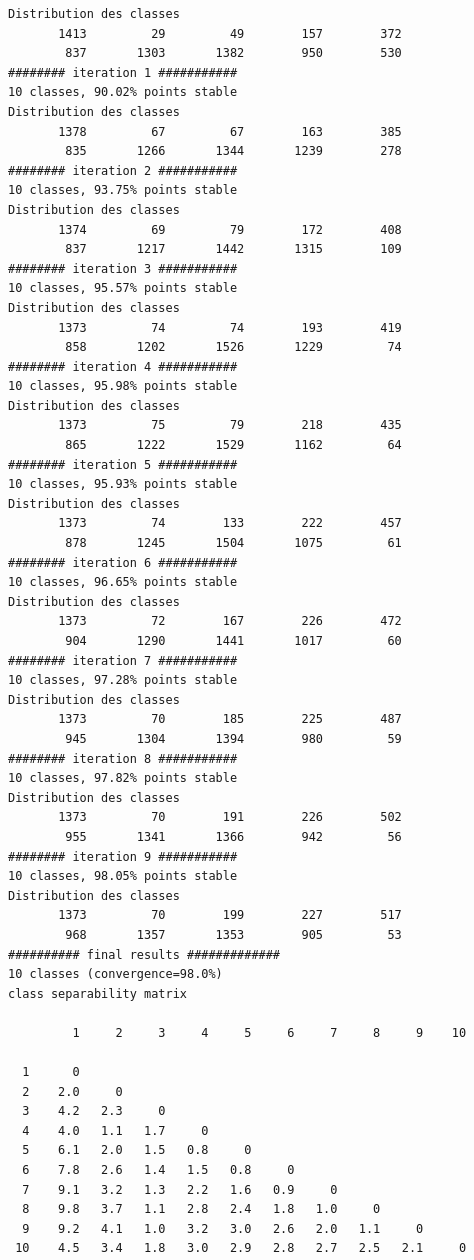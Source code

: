 \documentclass[environments,article,submit,pdftex,moreauthors]{Definitions/mdpi}
\begin{document}
\begin{scriptsize}
\begin{verbatim}
Distribution des classes
       1413         29         49        157        372
        837       1303       1382        950        530
######## iteration 1 ###########
10 classes, 90.02% points stable
Distribution des classes
       1378         67         67        163        385
        835       1266       1344       1239        278
######## iteration 2 ###########
10 classes, 93.75% points stable
Distribution des classes
       1374         69         79        172        408
        837       1217       1442       1315        109
######## iteration 3 ###########
10 classes, 95.57% points stable
Distribution des classes
       1373         74         74        193        419
        858       1202       1526       1229         74
######## iteration 4 ###########
10 classes, 95.98% points stable
Distribution des classes
       1373         75         79        218        435
        865       1222       1529       1162         64
######## iteration 5 ###########
10 classes, 95.93% points stable
Distribution des classes
       1373         74        133        222        457
        878       1245       1504       1075         61
######## iteration 6 ###########
10 classes, 96.65% points stable
Distribution des classes
       1373         72        167        226        472
        904       1290       1441       1017         60
######## iteration 7 ###########
10 classes, 97.28% points stable
Distribution des classes
       1373         70        185        225        487
        945       1304       1394        980         59
######## iteration 8 ###########
10 classes, 97.82% points stable
Distribution des classes
       1373         70        191        226        502
        955       1341       1366        942         56
######## iteration 9 ###########
10 classes, 98.05% points stable
Distribution des classes
       1373         70        199        227        517
        968       1357       1353        905         53
########## final results #############
10 classes (convergence=98.0%)
class separability matrix

         1     2     3     4     5     6     7     8     9    10

  1      0
  2    2.0     0
  3    4.2   2.3     0
  4    4.0   1.1   1.7     0
  5    6.1   2.0   1.5   0.8     0
  6    7.8   2.6   1.4   1.5   0.8     0
  7    9.1   3.2   1.3   2.2   1.6   0.9     0
  8    9.8   3.7   1.1   2.8   2.4   1.8   1.0     0
  9    9.2   4.1   1.0   3.2   3.0   2.6   2.0   1.1     0
 10    4.5   3.4   1.8   3.0   2.9   2.8   2.7   2.5   2.1     0


\end{verbatim}
\end{scriptsize}
\end{document}
